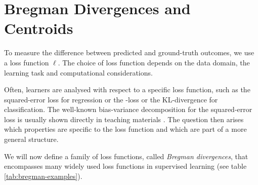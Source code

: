\documentclass[
	twoside=false, %
]{kaobook}
\begin{document}
\section{Bregman Divergences and Centroids}

To measure the difference between predicted and ground-truth outcomes, we use a loss function $\ell$. The choice of loss function depends on the data domain, the learning task and computational considerations. 

Often, learners are analysed with respect to a specific loss function, such as the squared-error loss \cite{scornet_ConsistencyRandomForests_2015} for regression or the \zeroone-loss \cite{theisen_WhenAreEnsembles_2023} or the KL-divergence \cite{webb_EnsembleNotEnsemble_2019} for classification. The well-known bias-variance decomposition for the squared-error loss is usually shown directly in teaching materials \cite{tibshirani_ElementsStatisticalLearning_2017, weinberger_Lecture12Bias_}. The question then arises which properties are specific to the loss function and which are part of a more general structure.

We will now define a family of loss functions, called \textit{Bregman divergences}, that encompasses many widely used loss functions in supervised learning (see table \ref{tab:bregman-examples}). 
\end{document}
